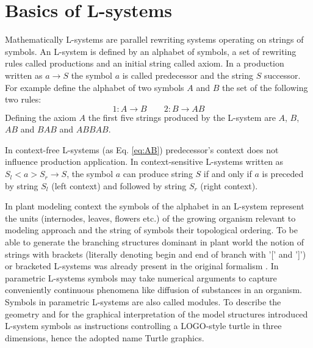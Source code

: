 \section{Basics of L-systems}

Mathematically L-systems  are parallel rewriting  systems operating on
strings of symbols. An L-system  is defined by an alphabet of symbols,
a  set of  rewriting rules  called productions  and an  initial string
called axiom. In a production  written as $a \rightarrow S$ the symbol
$a$ is called  predecessor and the string $S$  successor.  For example
define  the  alphabet of  two  symbols  $A$ and  $B$  the  set of  the
following two rules:
\begin{equation}\label{eq:AB}
1: A \rightarrow B \qquad 2: B \rightarrow AB 
\end{equation}
Defining the axiom $A$ the first five strings produced by the L-system
are $A$, $B$, $AB$ and $BAB$ and $ABBAB$.

In context-free L-systems  (as Eq.  \ref{eq:AB}) predecessor's context
does  not  influence  production  application.   In  context-sensitive
L-systems written as $S_l < a > S_r \rightarrow S$, the symbol $a$ can
produce string  $S$ if  and only  if $a$ is  preceded by  string $S_l$
(left context) and followed by string $S_r$ (right context).

In plant modeling  context the symbols of the  alphabet in an L-system
represent the units (internodes, leaves, flowers etc.)  of the growing
organism relevant to modeling approach and the string of symbols their
topological ordering.  To be able to generate the branching structures
dominant in plant world the notion of strings with brackets (literally
denoting  begin and  end  of branch  with  '[' and  ']') or  bracketed
L-systems   was   already    present   in   the   original   formalism
\citep{lindenmayer:68}.    In   parametric  L-systems   \citep{pp:90a}
symbols   may  take  numerical   arguments  to   capture  conveniently
continuous  phenomena like  diffusion  of substances  in an  organism.
Symbols in parametric L-systems  are also called modules.  To describe
the  geometry  and  for  the  graphical interpretation  of  the  model
structures \citet{pp:86}  introduced L-system symbols  as instructions
controlling   a   LOGO-style   turtle  \citep{abelson:82}   in   three
dimensions, hence the adopted name Turtle graphics.

